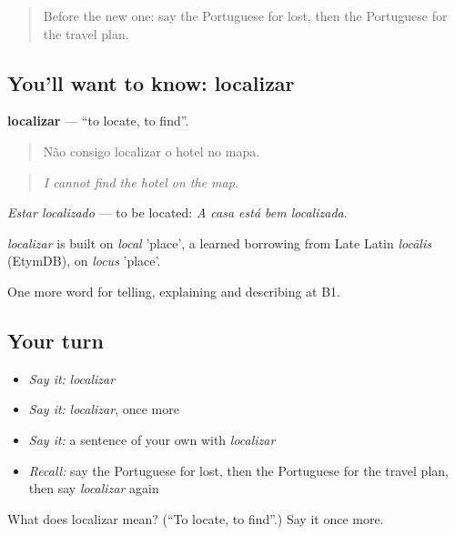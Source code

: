 \label{lesson:PT-C435-localizar}



\begin{quote}
Before the new one: say the Portuguese for lost, then the Portuguese for the travel plan.
\end{quote}

\subsection*{You'll want to know: localizar}
\textbf{localizar} — \textquotedblleft{}to locate, to find\textquotedblright{}.

\begin{quote}
Não consigo localizar o hotel no mapa.
\end{quote}

\begin{quote}
\emph{I cannot find the hotel on the map.}
\end{quote}

\emph{Estar localizado} — to be located: \emph{A casa está bem localizada}.

\begin{cousinweb}
\emph{localizar} is built on \emph{local} 'place', a learned borrowing from Late Latin \emph{locālis} (EtymDB), on \emph{locus} 'place'.
\end{cousinweb}

\begin{grammarlens}[title={What you've built}]
One more word for telling, explaining and describing at B1.
\end{grammarlens}

\subsection*{Your turn}
\begin{itemize}
\raggedright
  \item \emph{Say it:} \emph{localizar}
  \item \emph{Say it:} \emph{localizar}, once more
  \item \emph{Say it:} a sentence of your own with \emph{localizar}
  \item \emph{Recall:} say the Portuguese for lost, then the Portuguese for the travel plan, then say \emph{localizar} again
\end{itemize}

\begin{tcolorbox}[breakable,colback=teal!4,colframe=teal!35!black,title={Before you move on}]
What does localizar mean? (\textquotedblleft{}To locate, to find\textquotedblright{}.) Say it once more.
\end{tcolorbox}
